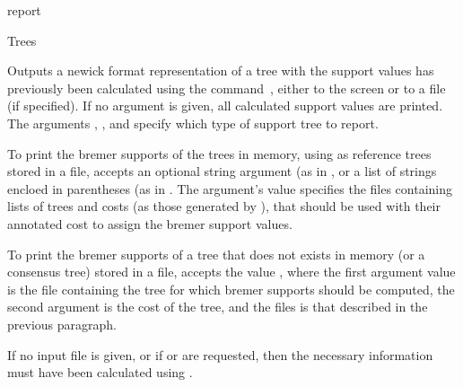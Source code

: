 \begin{command}{report}{}
\begin{arguments}
\begin{argumentgroup}{Trees}
                {Outputs a newick format representation of a tree with the
                support values has previously been calculated using the
                command~,
                either to the screen or to a file (if specified). If no argument
                is given, all calculated support values are printed. The arguments
                , , and
                 specify which type of support tree to
                report. 
                
                To print the bremer supports of the trees in memory, using as
                reference trees stored in a file, 
                 accepts an optional string argument
                (as in , 
                or a list of strings encloed in parentheses (as in
                . The argument's value specifies the files containing lists of trees and costs (as
                those generated by ), that should be used with
                their annotated cost to assign the bremer support values. 

                To print the bremer supports of a tree that does not exists in
                memory (or a consensus tree)
                stored in a file,  accepts the value
                , where the
                first argument value is the file containing the tree for which
                bremer supports should be computed, the second argument is the
                cost of the tree, and the files is that described in the
                previous paragraph.

                If no input file is given, or if  or
                 are requested,
                then the necessary information must have been calculated 
                using .
                
}
\end{argumentgroup}
\end{arguments}
\end{command}
